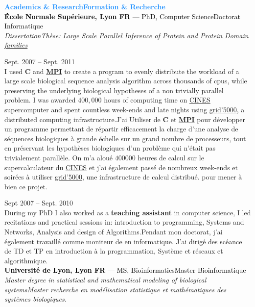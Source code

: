 \documentclass[a4paper]{article}
\newcommand\enfr[2]{\ifdefined\doen#1\else#2\fi\xspace}
\newcommand\cpplang{\textbf{C\raisebox{0.1em}{++}}\xspace}
\newcommand\mpi{\href{https://en.wikipedia.org/wiki/Message_Passing_Interface}{\textbf{MPI}}\xspace}
\newcommand\heading[1]{\Large\textsf{\textbf{\textcolor{DodgerBlue}{#1}}}\normalsize}
\newcommand\entry[2]{\large\textcolor{Black}{\textbf{#1} --- #2}\normalsize}
\newcommand\timespan[2]{\normalsize\textsf{#1 -- #2}}
\begin{document}
\pagebreak
\begin{minipage}[t]{0.63\textwidth}
\heading{\enfr{Academics \& Research}{Formation \& Recherche}}\\

\entry{École Normale Supérieure, Lyon\enfr{ FR}{}}{\enfr{PhD, Computer Science}{Doctorat Informatique}}\\
\textit{\enfr{Dissertation}{Thèse}:} \href{https://www.theses.fr/en/2011ENSL0643}{\textit{Large Scale Parallel Inference of Protein and Protein Domain families}}

\vspace{0.5em}
\timespan{Sept. 2007}{Sept. 2011}\\
\enfr{I used \cpplang and \mpi to create a program to evenly
distribute the workload of a large scale biological sequence analysis
algorithm across thousands of cpus, while preserving the underlying
biological hypotheses of a non trivially parallel problem. I was
awarded $400,000$ hours of computing time on
\href{https://www.cines.fr/en/supercomputing-2/}{CINES}
supercomputer and spent countless week-ends and late nights using
\href{https://www.grid5000.fr/w/Grid5000:Home}{grid'5000}, a
distributed computing infrastructure.}
{J'ai Utiliser de \cpplang et \mpi pour développer un programme
  permettant de répartir efficacement la charge d'une analyse de
  séquences biologiques à grande échelle sur un grand nombre de
  processeurs, tout en préservant les hypothèses biologiques d'un
  problème qui n'était pas trivialement parallèle. On m'a aloué $400
  000$ heures de calcul sur le supercalculateur du
  \href{https://www.cines.fr/en/supercomputing-2/}{CINES} et j'ai
  également passé de nombreux week-ends et soirées à utiliser
  \href{https://www.grid5000.fr/w/Grid5000:Home}{grid'5000}, une
  infrastructure de calcul distribué. pour mener à bien ce projet.}

\vspace{0.5em}
\timespan{Sept 2007}{Sept. 2010}\\
\enfr{During my PhD I also worked as a \textbf{teaching assistant} in computer
science, I led recitations and practical sessions in: introduction to
programming, Systems and Networks, Analysis and design of Algorithms.}
{Pendant mon doctorat, j'ai également travaillé comme moniteur de en
  informatique. J'ai dirigé des scéance de TD et TP en introduction à
  la programmation, Système et réseaux et algorithmique.}\\

\entry{Université de Lyon, Lyon\enfr{ FR}{}}{\enfr{MS, Bioinformatics}{Master Bioinformatique}}\\
\textit{\enfr{Master degree in statistical and mathematical modeling of biological
systems}{Master recherche en modélisation statistique et mathématiques des systèmes biologiques.}}


\end{minipage}
\end{document}
